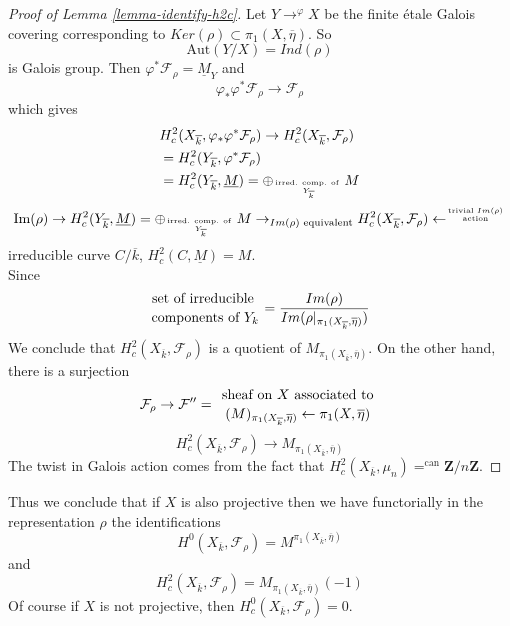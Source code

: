 \begin{proof}[Proof of Lemma \ref{lemma-identify-h2c}]
Let $Y\to^{\varphi}X$ be the finite \'etale Galois covering
corresponding to $Ker(\rho)\subset \pi_1(X, \overline\eta)$. So
$$
\text{Aut}(Y/X)=Ind(\rho)
$$
is Galois group. Then $\varphi^*\mathcal{F}_\rho =\underline M_Y$ and
$$
\varphi_*\varphi^*\mathcal{F}_\rho\to \mathcal{F}_\rho
$$
which gives
\begin{align*}
&H_c^2(X_{\overline k}, \varphi_*\varphi^*\mathcal{F}_\rho) \to
H_c^2(X_{\overline k}, \mathcal{F}_\rho)\\
&=H_c^2(Y_{\overline k}, \varphi^*\mathcal{F}_\rho)\\
&=H_c^2(Y_{\overline k}, \underline M) = \oplus_{\text{irred.
comp. of }\atop Y_{\overline k}}M
\end{align*}
$$
\text{Im}(\rho)\rightarrow H_c^2(Y_{\overline k}, \underline M) =
\oplus_{\text{irred. comp. of }\atop Y_{\overline k}}M\to_{Im(\rho)\text{
equivalent}} H_c^2(X_{\overline k},
\mathcal{F}_{\rho})\leftarrow^{\text{trivial }Im(\rho)\atop \text{action}}
$$
irreducible curve $C/\overline k$, $H_c^2(C, \underline M)=M$.
\\
Since
$$
{\text{set of irreducible }\atop\text{components of }Y_k} =
\frac{Im(\rho)}{Im(\rho|_{\pi_1(X_{\overline k}, \overline \eta)})}
$$
We conclude that $H_c^2(X_{\overline k}, \mathcal{F}_\rho)$ is a
quotient of $M_{\pi_1(X_{\overline k}, \overline \eta)}$. On the other hand,
there is a surjection
$$
\mathcal{F}_\rho\to \mathcal{F}'' = {\text{ sheaf on }
X\text{ associated to }\atop (M)_{\pi_1(X_{\overline k}, \overline
\eta)}\leftarrow\pi_1(X, \overline \eta)}
$$
$$
H_c^2(X_{\overline k}, \mathcal{F}_\rho)\to
M_{\pi_1(X_{\overline k}, \overline\eta)}
$$
The twist in Galois action comes from the fact that
$H_c^2(X_{\overline k}, \mu_n)=^{\text{can}} \mathbf{Z}/n\mathbf{Z}$.
\end{proof}

\begin{remark}
\label{remark-projective}
Thus we conclude that if $X$ is also projective then
we have functorially in the representation $\rho$
the identifications
$$
H^0(X_{\overline k}, \mathcal{F}_\rho) =
M^{\pi_1(X_{\overline k}, \overline\eta)}
$$
and
$$
H_c^2(X_{\overline k}, \mathcal{F}_\rho) =
M_{\pi_1(X_{\overline k}, \overline \eta)}(-1)
$$
Of course if $X$ is not projective, then
$H^0_c(X_{\overline{k}}, \mathcal{F}_\rho) = 0$.
\end{remark}


